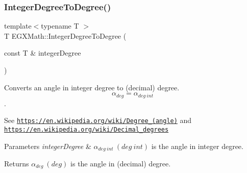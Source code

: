 \subsubsection{\texorpdfstring{Integer\+Degree\+To\+Degree()}{IntegerDegreeToDegree()}}
{\footnotesize\ttfamily template$<$typename T $>$ \\
T E\+G\+X\+Math\+::\+Integer\+Degree\+To\+Degree (\begin{DoxyParamCaption}\item[{const T \&}]{integer\+Degree }\end{DoxyParamCaption})}



Converts an angle in integer degree to (decimal) degree. \[\alpha_{deg}=\alpha_{deg\ int}\]. 

See \href{https://en.wikipedia.org/wiki/Degree_(angle)}{\tt https\+://en.\+wikipedia.\+org/wiki/\+Degree\+\_\+(angle)} and \href{https://en.wikipedia.org/wiki/Decimal_degrees}{\tt https\+://en.\+wikipedia.\+org/wiki/\+Decimal\+\_\+degrees} 
\begin{DoxyParams}{Parameters}
{\em integer\+Degree} & $\alpha_{deg\ int}\ (deg\ int)$ is the angle in integer degree. \\
\hline
\end{DoxyParams}
\begin{DoxyReturn}{Returns}
$\alpha_{deg}\ (deg)$ is the angle in (decimal) degree. 
\end{DoxyReturn}
